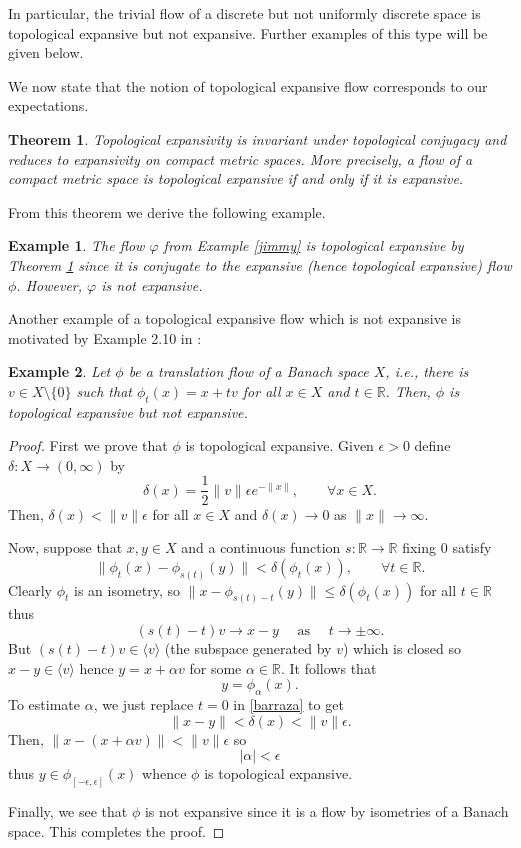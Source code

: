 \documentclass[11pt,letterpaper]{amsart}
\newtheorem{thm}{Theorem}%
\newtheorem{ex}{Example}[section]
\begin{document}
In particular, the trivial flow of a discrete but not uniformly discrete space is topological expansive but not expansive. Further examples of this type will be given below.

We now state that the notion of topological expansive flow corresponds to our expectations.

\begin{thm}
\label{thA}
Topological expansivity is invariant under topological conjugacy and reduces to expansivity on compact metric spaces. More precisely, a flow of a compact metric space is topological expansive if and only if it is expansive.
\end{thm}

From this theorem we derive the following example.

\begin{ex}
\label{patin}
The flow $\varphi$ from Example \ref{jimmy} is topological expansive by Theorem \ref{thA}
since it is conjugate to the expansive (hence topological expansive) flow $\phi$. However, $\varphi$ is not expansive.
\end{ex}

Another example of a topological expansive flow which is not expansive is motivated by Example 2.10 in \cite{c}:

\begin{ex}
\label{jim}
Let $\phi$ be a {\em translation flow} of a Banach space $X$, i.e.,
there is $v\in X\setminus\{0\}$ such that $\phi_t(x)=x+tv$ for all $x\in X$ and $t\in\mathbb{R}$. Then, $\phi$ is topological expansive but not expansive.
\end{ex}

\begin{proof}
First we prove that $\phi$ is topological expansive.
Given $\epsilon>0$ define
$\delta:X\to(0,\infty)$ by
$$
\delta(x)=\frac{1}2\|v\|\epsilon e^{-\|x\|},\quad\quad\forall x\in X.
$$
Then, $\delta(x)<\|v\|\epsilon$ for all $x\in X$ and
$\delta(x)\to0$ as $\|x\|\to\infty$.

Now, suppose that $x,y\in X$ and a continuous function $s:\mathbb{R}\to\mathbb{R}$ fixing $0$ satisfy
\begin{equation}
\label{barraza}
\|\phi_t(x)-\phi_{s(t)}(y)\|<\delta(\phi_t(x)),\quad\quad\forall t\in\mathbb{R}.
\end{equation}
Clearly $\phi_t$ is an isometry, so
$\|x-\phi_{s(t)-t}(y)\|\leq \delta(\phi_t(x))$ for all $t\in\mathbb{R}$ thus
$$
(s(t)-t)v\to x-y\quad\mbox{ as }\quad
t\to\pm\infty.
$$
But $(s(t)-t)v\in \langle v\rangle$ (the subspace generated by $v$) which is closed so $x-y\in \langle v\rangle$ hence
$y=x+\alpha v$ for some $\alpha\in\mathbb{R}$.
It follows that
$$
y=\phi_\alpha(x).
$$
To estimate $\alpha$, we just replace $t=0$ in \eqref{barraza} to get
$$
\|x-y\|<\delta(x)<\|v\|\epsilon.
$$
Then, $\|x-(x+\alpha v)\|<\|v\|\epsilon$ so
$$
|\alpha|<\epsilon
$$
thus $y\in \phi_{[-\epsilon,\epsilon]}(x)$ whence $\phi$ is topological expansive.

Finally, we see that $\phi$ is not expansive since it is a flow by isometries of a Banach space.
This completes the proof.
\end{proof}
\end{document}
